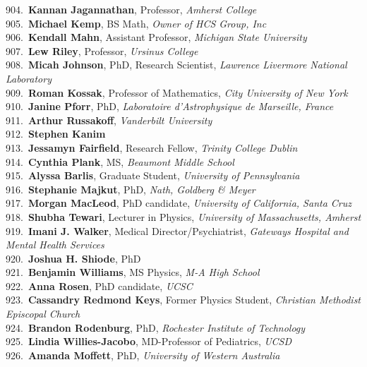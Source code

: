 904.~{\bf Kannan Jagannathan}, Professor, {\sl Amherst College} \\
905.~{\bf Michael Kemp}, BS Math, {\sl Owner of HCS Group, Inc} \\
906.~{\bf Kendall Mahn}, Assistant Professor, {\sl Michigan State University} \\
907.~{\bf Lew Riley}, Professor, {\sl Ursinus College} \\
908.~{\bf Micah Johnson}, PhD, Research Scientist, {\sl Lawrence Livermore National Laboratory } \\
909.~{\bf Roman Kossak}, Professor of Mathematics, {\sl City University of New York} \\
910.~{\bf Janine Pforr}, PhD, {\sl Laboratoire d'Astrophysique de Marseille, France} \\
911.~{\bf Arthur Russakoff}, {\sl Vanderbilt University} \\
912.~{\bf Stephen Kanim} \\
913.~{\bf Jessamyn Fairfield}, Research Fellow, {\sl Trinity College Dublin} \\
914.~{\bf Cynthia Plank}, MS, {\sl Beaumont Middle School} \\
915.~{\bf Alyssa Barlis}, Graduate Student, {\sl University of Pennsylvania} \\
916.~{\bf Stephanie Majkut}, PhD, {\sl Nath, Goldberg \& Meyer} \\
917.~{\bf Morgan MacLeod}, PhD candidate, {\sl University of California, Santa Cruz} \\
918.~{\bf Shubha Tewari}, Lecturer in Physics, {\sl University of Massachusetts, Amherst} \\
919.~{\bf Imani J. Walker}, Medical Director/Psychiatrist, {\sl Gateways Hospital and Mental Health Services} \\
920.~{\bf Joshua H. Shiode}, PhD \\
921.~{\bf Benjamin Williams}, MS Physics, {\sl M-A High School} \\
922.~{\bf Anna Rosen}, PhD candidate, {\sl UCSC} \\
923.~{\bf Cassandry Redmond Keys}, Former Physics Student, {\sl Christian Methodist Episcopal Church } \\
924.~{\bf Brandon Rodenburg}, PhD, {\sl Rochester Institute of Technology} \\
925.~{\bf Lindia Willies-Jacobo}, MD-Professor of Pediatrics, {\sl UCSD} \\
926.~{\bf Amanda Moffett}, PhD, {\sl University of Western Australia} \\
